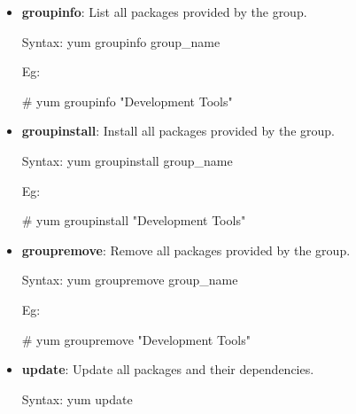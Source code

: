 \begin{flushleft}
\begin{itemize}
		\item \textbf{groupinfo}: List all packages provided by the group.
		\begin{tcolorbox}[breakable,notitle,boxrule=-0pt,colback=pink,colframe=pink]
			\color{black}
			\font=9pt
			Syntax: yum groupinfo group\_name 
			\font=4pt
		\end{tcolorbox}
		Eg:
		\begin{tcolorbox}[breakable,notitle,boxrule=-0pt,colback=black,colframe=black]
			\color{green}
			\font=9pt
			\# yum groupinfo "Development Tools"
			\font=4pt
		\end{tcolorbox}
		\bigskip
		\bigskip	

		\item \textbf{groupinstall}: Install all packages provided by the group.
		\begin{tcolorbox}[breakable,notitle,boxrule=-0pt,colback=pink,colframe=pink]
			\color{black}
			\font=9pt
			Syntax: yum groupinstall group\_name 
			\font=4pt
		\end{tcolorbox}
		Eg:
		\begin{tcolorbox}[breakable,notitle,boxrule=-0pt,colback=black,colframe=black]
			\color{green}
			\font=9pt
			\# yum groupinstall "Development Tools"
			\font=4pt
		\end{tcolorbox}
		\bigskip
		\bigskip	

		\item \textbf{groupremove}: Remove all packages provided by the group.
		\begin{tcolorbox}[breakable,notitle,boxrule=-0pt,colback=pink,colframe=pink]
			\color{black}
			\font=9pt
			Syntax: yum groupremove group\_name 
			\font=4pt
		\end{tcolorbox}
		Eg:
		\begin{tcolorbox}[breakable,notitle,boxrule=-0pt,colback=black,colframe=black]
			\color{green}
			\font=9pt
			\# yum groupremove "Development Tools"
			\font=4pt
		\end{tcolorbox}
		\bigskip
		\bigskip	


		\item \textbf{update}: Update all packages and their dependencies.
		\begin{tcolorbox}[breakable,notitle,boxrule=-0pt,colback=pink,colframe=pink]
			\color{black}
			\font=9pt
			Syntax: yum update
			\font=4pt
		\end{tcolorbox}
		\bigskip
		\bigskip	


\end{itemize}
\end{flushleft}
